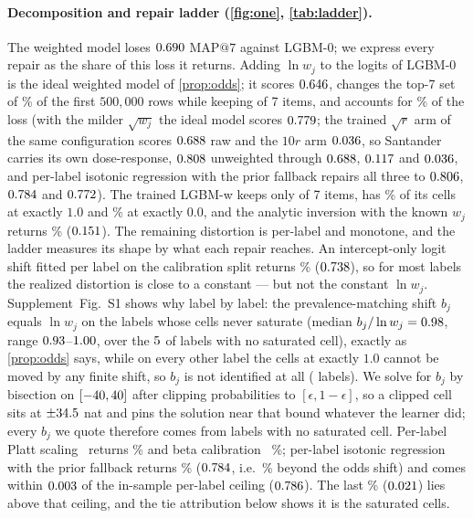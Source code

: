 \documentclass[sigconf,nonacm]{acmart}
\makeatletter
\newcommand{\Sm}{\textsf{LGBM-w}\xspace}
\newcommand{\Nm}{\textsf{LGBM-0}\xspace}
\newcommand{\mapseven}{\mathrm{MAP}@7\xspace}
\newcommand{\Supp}[1]{Supplement~#1}  %
\makeatother
\begin{document}
\paragraph{Decomposition and repair ladder (\cref{fig:one}, \cref{tab:ladder}).} The weighted model loses $0.690$ $\mapseven$ against \Nm; we express every repair as the share of this loss it returns. Adding $\ln w_j$ to the logits of \Nm is the ideal weighted model of \cref{prop:odds}; it scores $0.646$, changes the top-7 set of \nfracRowsChangedWhatif\% of the first $500{,}000$ rows while keeping \noverlapWhatif{} of 7 items, and accounts for \noddsShare\% of the loss (with the milder $\sqrt{w_j}$ the ideal model scores $0.779$; the trained $\sqrt{r}$ arm of the same configuration scores $0.688$ raw and the $10r$ arm $0.036$, so Santander carries its own dose-response, $0.808$ unweighted through $0.688$, $0.117$ and $0.036$, and per-label isotonic regression with the prior fallback repairs all three to $0.806$, $0.784$ and $0.772$). The trained \Sm keeps only \noverlapS{} of 7 items, has \nSsatOne\% of its cells at exactly $1.0$ and \nSsatZero\% at exactly $0.0$, and the analytic inversion with the known $w_j$ returns \nelkanShare\% ($0.151$). The remaining distortion is per-label and monotone, and the ladder measures its shape by what each repair reaches. An intercept-only logit shift fitted per label on the calibration split returns \noffsetShare\% ($0.738$), so for most labels the realized distortion is close to a constant --- but not the constant $\ln w_j$. \Supp{Fig.~S1} shows why label by label: the prevalence-matching shift $b_j$ equals $\ln w_j$ on the labels whose cells never saturate (median $b_j/\ln w_j=0.98$, range $0.93$--$1.00$, over the $5$ of \nnLabels{} labels with no saturated cell), exactly as \cref{prop:odds} says, while on every other label the cells at exactly $1.0$ cannot be moved by any finite shift, so $b_j$ is not identified at all (\nnCappedShift{} labels). We solve for $b_j$ by bisection on $[-40,40]$ after clipping probabilities to $[\epsilon,1-\epsilon]$, so a clipped cell sits at $\pm34.5$ nat and pins the solution near that bound whatever the learner did; every $b_j$ we quote therefore comes from labels with no saturated cell. Per-label Platt scaling~\cite{Platt1999} returns \nplattShare\% and beta calibration~\cite{Kull2017Beta} \nbetaShare\%; per-label isotonic regression with the prior fallback returns \nrepairShare\% ($0.784$, i.e.\ \nrepairExtraShare\% beyond the odds shift) and comes within $0.003$ of the in-sample per-label ceiling ($0.786$). The last \ntieShare\% ($0.021$) lies above that ceiling, and the tie attribution below shows it is the saturated cells.
\end{document}
